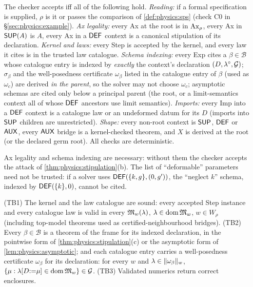 \begin{definition}\label{def:physics:checker}
The checker accepts iff all of the following hold. \emph{Reading:} if a formal specification is
supplied, $\rho$ is it or passes the comparison of \cref{def:physics:sps} (check C0 in
\S\ref{sec:physics:example}). \emph{Ax legality:} every Ax at the root is in $\mathrm{Ax}_\rho$,
every Ax in $\mathsf{SUP}(A)$ is $A$, every Ax in a $\mathsf{DEF}$ context is a canonical stipulation of its
declaration. \emph{Kernel and laws:} every Step is accepted by the kernel, and every law it
cites is in the trusted law catalogue. \emph{Schema indexing:} every Exp cites a
$\beta\in\mathcal B$ whose catalogue entry is indexed by \emph{exactly} the context's
declaration $(D,\lambda^\circ,\mathcal{G})$; $\sigma_\beta$ and the well-posedness certificate
$\omega_\beta$ listed in the catalogue entry of $\beta$ (used as $\omega_c$) are derived
\emph{in the parent}, so the solver may not choose $\omega_c$; asymptotic schemas are cited
only below a principal parent (the root, or a limit-semantics context all of whose $\mathsf{DEF}$
ancestors use limit semantics). \emph{Imports:} every Imp into a $\mathsf{DEF}$ context is a
catalogue law or an undeformed datum for its $D$ (imports into $\mathsf{SUP}$ children are
unrestricted). \emph{Shape:} every non-root context is $\mathsf{SUP}$, $\mathsf{DEF}$ or $\mathsf{AUX}$, every $\mathsf{AUX}$
bridge is a kernel-checked theorem, and $X$ is derived at the root (or the declared germ
root). All checks are deterministic.
\end{definition}

Ax legality and schema indexing are necessary: without them the checker accepts the attack
of \cref{thm:physics:stipulation}(b). The list of ``deformable'' parameters need not be
trusted: if a solver uses $\mathsf{DEF}(\{k,g\},(0,g'))$, the ``neglect $k$'' schema, indexed by
$\mathsf{DEF}(\{k\},0)$, cannot be cited.

\begin{assumption}\label{asm:physics:trusted}
(TB1) The kernel and the law catalogue are sound: every accepted Step instance and every
catalogue law is valid in every $\mathfrak{M}_w(\lambda)$, $\lambda\in\operatorname{dom}\mathfrak{M}_w$, $w\in W_\rho$
(including top-model theorems used as certified-neighbourhood bridges). (TB2) Every
$\beta\in\mathcal B$ is a theorem of the frame for its indexed declaration, in the pointwise
form of \cref{thm:physics:stipulation}(c) or the asymptotic form of
\cref{lem:physics:asymptotic}; and each catalogue entry carries a well-posedness
certificate $\omega_\beta$ for its declaration: for every $w$ and
$\lambda\in\lVert \omega_\beta\rVert_w$, $\{\mu:\lambda[D{:=}\mu]\in\operatorname{dom}\mathfrak{M}_w\}\in\mathcal{G}$. (TB3)
Validated numerics return correct enclosures.
\end{assumption}

